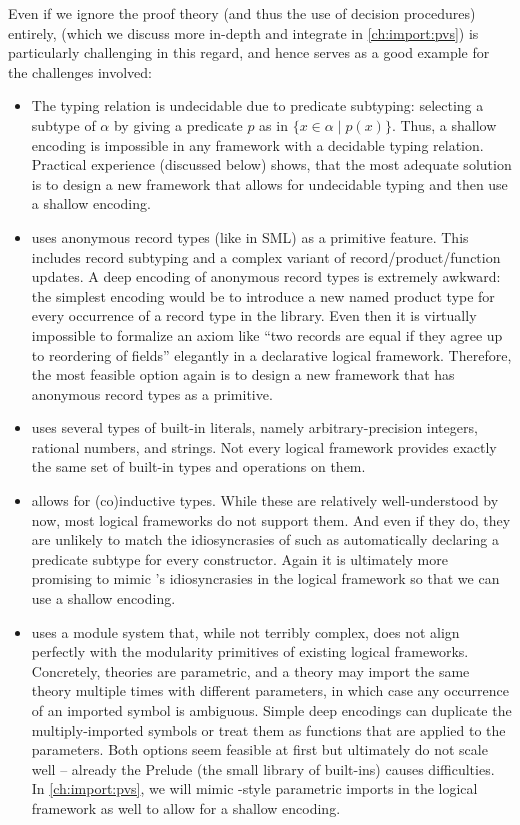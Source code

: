 Even if we ignore the proof theory (and thus the use of decision procedures) entirely, \pvs (which we discuss more in-depth and integrate in \autoref{ch:import:pvs}) is particularly challenging in this regard, and hence serves as a good example for the challenges involved:
\begin{itemize}
\item The \pvs typing relation is undecidable due to predicate subtyping: selecting a subtype
of $\alpha$ by giving a predicate $p$ as in $\{x\in\alpha\mid p(x)\}$.  Thus, a shallow
encoding is impossible in any framework with a decidable typing relation. Practical experience (discussed below) shows, that the most adequate solution is to design a new framework that allows for undecidable typing and then
use a shallow encoding.

\item \pvs uses anonymous record types (like in SML) as a primitive feature.  This includes
record subtyping and a complex variant of record/product/function updates.  A deep
encoding of anonymous record types is extremely awkward: the simplest encoding would be
to introduce a new named product type for every occurrence of a record type in the
library.  Even then it is virtually impossible to formalize an axiom like ``two records
are equal if they agree up to reordering of fields'' elegantly in a declarative logical framework.
Therefore, the most feasible option again is to design a new framework that has anonymous record types as a primitive.

\item \pvs uses several types of built-in literals, namely arbitrary-precision integers, rational numbers, and strings.
Not every logical framework provides exactly the same set of built-in types and operations on them.

\item \pvs allows for (co)inductive types.  While these are relatively well-understood by now,
most logical frameworks do not support them.  And even if they do, they are unlikely to
match the idiosyncrasies of \pvs such as automatically declaring a predicate subtype for every
constructor.  Again it is ultimately more promising to mimic \pvs's idiosyncrasies in the
logical framework so that we can use a shallow encoding.

\item \pvs uses a module system that, while not terribly complex, does not align perfectly with
the modularity primitives of existing logical frameworks.  Concretely, theories are
parametric, and a theory may import the same theory multiple times with different
parameters, in which case any occurrence of an imported symbol is ambiguous.  Simple deep
encodings can duplicate the multiply-imported symbols or treat them as functions that are
applied to the parameters.  Both options seem feasible at first but ultimately do not
scale well -- already the \pvs Prelude (the small library of \pvs built-ins) causes
difficulties.  In \autoref{ch:import:pvs}, we will mimic \pvs-style parametric
imports in the logical framework as well to allow for a shallow encoding.
\end{itemize}


